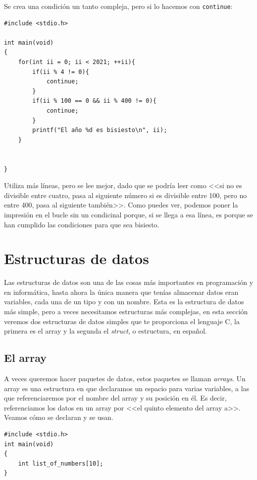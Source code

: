 \documentclass[a4paper]{article}
\begin{document}
Se crea una condición un tanto compleja, pero si lo hacemos con \verb!continue!:

\noindent
\begin{minipage}[H]{\linewidth}
\mbox{}
\begin{lstlisting}[style=C,
caption={Ejemplo de algoritmo con continue},
label={lst:continueExample}]
#include <stdio.h>

int main(void)
{
    for(int ii = 0; ii < 2021; ++ii){
        if(ii % 4 != 0){
            continue;
        }
        if(ii % 100 == 0 && ii % 400 != 0){
            continue;
        }
        printf("El año %d es bisiesto\n", ii);
    }


}
\end{lstlisting}
\end{minipage}

Utiliza más líneas, pero se lee mejor, dado que se podría leer como <<si no
es divisible entre cuatro, pasa al siguiente número si es divisible entre 100,
pero no entre 400, pasa al siguiente también>>.
Como puedes ver, podemos poner la impresión en el bucle sin un condicinal
porque, si se llega a esa línea, es porque se han cumplido las condiciones para
que sea bisiesto.

\section{Estructuras de datos}
Las estructuras de datos son una de las cosas más importantes en programación
y en informática, hasta ahora la única manera que tenías almacenar datos eran
variables, cada una de un tipo y con un nombre. Esta es la estructura de datos
más simple, pero a veces necesitamos estructuras más complejas, en esta sección
veremos dos estructuras de datos simples que te proporciona el lenguaje C, la
primera es el array y la segunda el \textit{struct}, o estructura, en español.

\subsection{El array}
A veces queremos hacer paquetes de datos, estos paquetes se llaman
\textit{arrays}. Un array es
una estructura en que declaramos un espacio para varias variables, a las que
referenciaremos por el nombre del array y su posición en él. Es decir,
referenciamos los datos en un array por <<el quinto elemento del array a>>.
Veamos cómo se declaran y se usan.


\noindent
\begin{minipage}[H]{\linewidth}
\mbox{}
\begin{lstlisting}[style=C,
caption={Ejemplo de declaración de array},
label={lst:arrayDeclaration}]
#include <stdio.h>
int main(void)
{
    int list_of_numbers[10];
}
\end{lstlisting}
\end{minipage}
\end{document}
